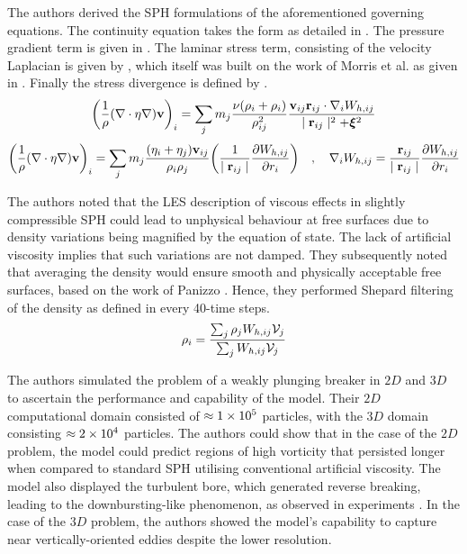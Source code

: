 The authors derived the SPH formulations of the aforementioned governing equations. The continuity equation takes the form as detailed in . The pressure gradient term is given in . The laminar stress term, consisting of the velocity Laplacian is given by , which itself was built on the work of Morris et al. \parencite{morris1997modeling} as given in . Finally the stress divergence is defined by .
\begin{equation}
    \bigg( \frac{1}{\rho} (\nabla \cdot \eta \nabla) \vect{v} \bigg)_i = \sum_j m_j \frac{\nu (\rho_i + \rho_i)}{\rho_{ij}^2} \frac{\VIJ \RIJ \cdot \DWIJ}{\RtwoIJ + \MachineEpsilon^2}
    \label{eq:ROGERS2005-vel-laplacian-sph}
\end{equation}
\begin{equation}
    \bigg( \frac{1}{\rho} (\nabla \cdot \eta \nabla) \vect{v} \bigg)_i = \sum_j m_j \frac{(\eta_i + \eta_j) \VIJ}{\rho_i \rho_j} \bigg( \frac{1}{\RtwoIJ[]} \PartialDerivative[r_i]{\WIJ} \bigg) \quad , \quad \DWIJ = \frac{\RIJ}{\RtwoIJ[]} \PartialDerivative[r_i]{\WIJ}
    \label{eq:morris1997modeling-vel-laplacian-sph}
\end{equation}

The authors noted that the LES description of viscous effects in slightly compressible SPH could lead to unphysical behaviour at free surfaces due to density variations being magnified by the equation of state. The lack of artificial viscosity implies that such variations are not damped. They subsequently noted that averaging the density would ensure smooth and physically acceptable free surfaces, based on the work of Panizzo \parencite{panizzo2004physical}. Hence, they performed Shepard filtering of the density as defined in  every 40-time steps.
\begin{equation}
    \rho_i = \frac{\sum_j \rho_j \WIJ \Vol_j}{\sum_j \WIJ \Vol_j}
    \label{eq:ROGERS2005-rho-shepard-filter}
\end{equation}

The authors simulated the problem of a weakly plunging breaker in $2D$ and $3D$ to ascertain the performance and capability of the model. Their $2D$ computational domain consisted of $\approx 1 \times {10}^{5}$ particles, with the $3D$ domain consisting $\approx 2 \times {10}^{4}$ particles.
The authors could show that in the case of the $2D$ problem, the model could predict regions of high vorticity that persisted longer when compared to standard SPH utilising conventional artificial viscosity. The model also displayed the turbulent bore, which generated reverse breaking, leading to the downbursting-like phenomenon, as observed in experiments \parencite{kubo2001large}.
In the case of the $3D$ problem, the authors showed the model’s capability to capture near vertically-oriented eddies despite the lower resolution. 

